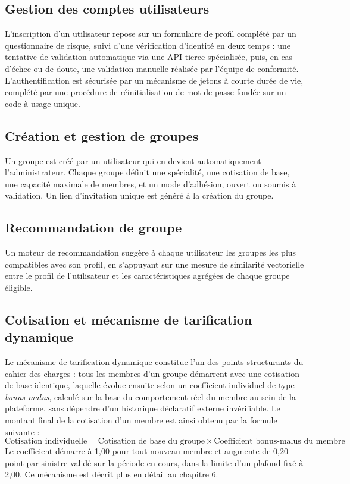 \documentclass[12pt,a4paper]{report}
\begin{document}
\subsection{Gestion des comptes utilisateurs}
L'inscription d'un utilisateur repose sur un formulaire de profil complété par un questionnaire de risque, suivi d'une vérification d'identité en deux temps : une tentative de validation automatique via une API tierce spécialisée, puis, en cas d'échec ou de doute, une validation manuelle réalisée par l'équipe de conformité. L'authentification est sécurisée par un mécanisme de jetons à courte durée de vie, complété par une procédure de réinitialisation de mot de passe fondée sur un code à usage unique.

\subsection{Création et gestion de groupes}
Un groupe est créé par un utilisateur qui en devient automatiquement l'administrateur. Chaque groupe définit une spécialité, une cotisation de base, une capacité maximale de membres, et un mode d'adhésion, ouvert ou soumis à validation. Un lien d'invitation unique est généré à la création du groupe.

\subsection{Recommandation de groupe}
Un moteur de recommandation suggère à chaque utilisateur les groupes les plus compatibles avec son profil, en s'appuyant sur une mesure de similarité vectorielle entre le profil de l'utilisateur et les caractéristiques agrégées de chaque groupe éligible.

\subsection{Cotisation et mécanisme de tarification dynamique}
Le mécanisme de tarification dynamique constitue l'un des points structurants du cahier des charges : tous les membres d'un groupe démarrent avec une cotisation de base identique, laquelle évolue ensuite selon un coefficient individuel de type \textit{bonus-malus}, calculé sur la base du comportement réel du membre au sein de la plateforme, sans dépendre d'un historique déclaratif externe invérifiable. Le montant final de la cotisation d'un membre est ainsi obtenu par la formule suivante :
\[
\text{Cotisation individuelle} = \text{Cotisation de base du groupe} \times \text{Coefficient bonus-malus du membre}
\]
Le coefficient démarre à 1,00 pour tout nouveau membre et augmente de 0,20 point par sinistre validé sur la période en cours, dans la limite d'un plafond fixé à 2,00. Ce mécanisme est décrit plus en détail au chapitre 6.
\end{document}
